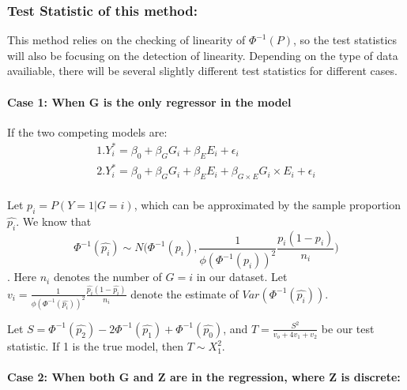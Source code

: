 \documentclass[]{article}
\let\oldparagraph\paragraph
\renewcommand{\paragraph}[1]{\oldparagraph{#1}\mbox{}}
\begin{document}
\hypertarget{test-statistic-of-this-method}{%
\subsubsection{Test Statistic of this
method:}\label{test-statistic-of-this-method}}

This method relies on the checking of linearity of \(\Phi^{-1}(P)\), so
the test statistics will also be focusing on the detection of linearity.
Depending on the type of data availiable, there will be several slightly
different test statistics for different cases.

\hypertarget{case-1-when-g-is-the-only-regressor-in-the-model}{%
\paragraph{Case 1: When G is the only regressor in the
model}\label{case-1-when-g-is-the-only-regressor-in-the-model}}

If the two competing models are: \begin{equation}
\begin{aligned}
1. Y_i ^{*} = \beta_0 + \beta_G G_i + \beta_E E_i + \epsilon_i \\
2. Y_i ^{*} = \beta_0 + \beta_G G_i + \beta_E E_i + \beta_{G\times E}G_i \times E_i + \epsilon_i \\
\end{aligned}
\end{equation}

Let \(p_i = P(Y = 1|G=i)\), which can be approximated by the sample
proportion \(\hat{p_i}\). We know that
\[\Phi^{-1}(\hat{p_i}) \sim N\bigg(\Phi^{-1}(p_i), \frac{1}{\phi(\Phi^{-1}(p_i))^2} \frac{p_i(1-p_i)}{n_i}\bigg)\].
Here \(n_i\) denotes the number of \(G = i\) in our dataset. Let
\(v_i = \frac{1}{\phi(\Phi^{-1}(\hat{p_i}))^2} \frac{\hat{p_i}(1-\hat{p_i})}{n_i}\)
denote the estimate of \(Var(\Phi^{-1}(\hat{p_i}))\).

Let
\(S = \Phi^{-1}(\hat{p_2}) - 2\Phi^{-1}(\hat{p_1}) + \Phi^{-1}(\hat{p_0})\),
and \(T = \frac{S^2}{v_o+4v_1+v_2}\) be our test statistic. If 1 is the
true model, then \(T \sim X^2_{1}\).

\hypertarget{case-2-when-both-g-and-z-are-in-the-regression-where-z-is-discrete}{%
\paragraph{Case 2: When both G and Z are in the regression, where Z is
discrete:}\label{case-2-when-both-g-and-z-are-in-the-regression-where-z-is-discrete}}
\end{document}
